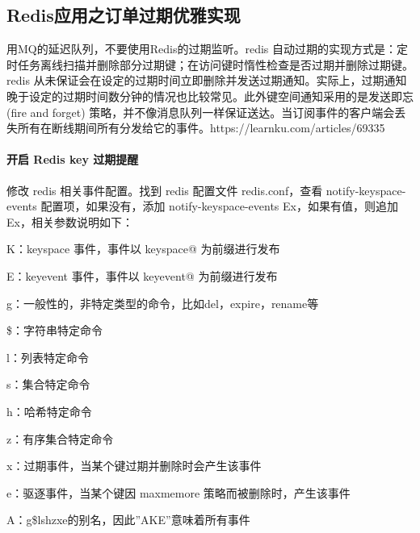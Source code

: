 \documentclass[../../../interview-questions.tex]{subfiles}
\begin{document}
\subsection{Redis应用之订单过期优雅实现}


用MQ的延迟队列，不要使用Redis的过期监听。redis 自动过期的实现方式是：定时任务离线扫描并删除部分过期键；在访问键时惰性检查是否过期并删除过期键。redis 从未保证会在设定的过期时间立即删除并发送过期通知。实际上，过期通知晚于设定的过期时间数分钟的情况也比较常见。此外键空间通知采用的是发送即忘 (fire and forget) 策略，并不像消息队列一样保证送达。当订阅事件的客户端会丢失所有在断线期间所有分发给它的事件。https://learnku.com/articles/69335


\paragraph{开启 Redis key 过期提醒}


修改 redis 相关事件配置。找到 redis 配置文件 redis.conf，查看 notify-keyspace-events 配置项，如果没有，添加 notify-keyspace-events Ex，如果有值，则追加 Ex，相关参数说明如下：

K：keyspace 事件，事件以 keyspace@ 为前缀进行发布

E：keyevent 事件，事件以 keyevent@ 为前缀进行发布

g：一般性的，非特定类型的命令，比如del，expire，rename等

\$：字符串特定命令

l：列表特定命令

s：集合特定命令

h：哈希特定命令

z：有序集合特定命令

x：过期事件，当某个键过期并删除时会产生该事件

e：驱逐事件，当某个键因 maxmemore 策略而被删除时，产生该事件

A：g\$lshzxe的别名，因此”AKE”意味着所有事件
\end{document}

